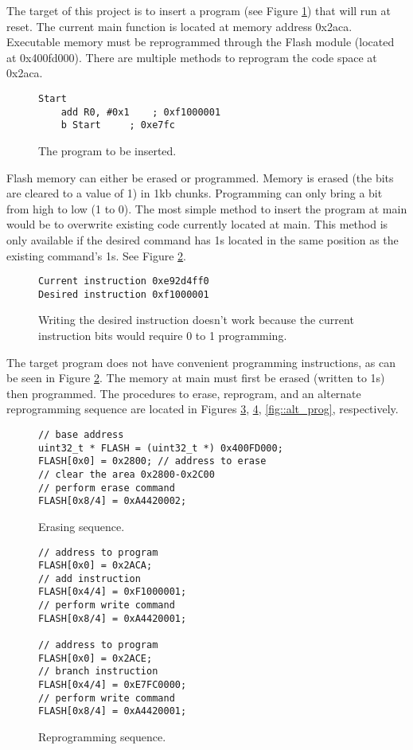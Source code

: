 The target of this project is to insert a program (see Figure \ref{fig::insert}) that will run at reset. The current main function is located at memory address 0x2aca. Executable memory must be reprogrammed through the Flash module (located at 0x400fd000). There are multiple methods to reprogram the code space at 0x2aca. 
	\begin{figure}[htbp]
		\begin{lstlisting}
Start
	add R0, #0x1 	; 0xf1000001
	b Start		; 0xe7fc
		\end{lstlisting}
		\caption{The program to be inserted. }\label{fig::insert}
	\end{figure}

Flash memory can either be erased or programmed. Memory is erased (the bits are cleared to a value of 1) in 1kb chunks. Programming can only bring a bit from high to low (1 to 0). The most simple method to insert the program at main would be to overwrite existing code currently located at main. This method is only available if the desired command has 1s located in the same position as the existing command's 1s. See Figure \ref{fig::ham}. 
	\begin{figure}[htbp]
		\begin{lstlisting}
Current instruction	0xe92d4ff0
Desired instruction	0xf1000001
		\end{lstlisting}
		\caption{Writing the desired instruction doesn't work because the current instruction bits would require 0 to 1 programming.  }\label{fig::ham}
	\end{figure}
The target program does not have convenient programming instructions, as can be seen in Figure \ref{fig::ham}. The memory at main must first be erased (written to 1s) then programmed. The procedures to erase, reprogram, and an alternate reprogramming sequence are located in Figures \ref{fig::erase}, \ref{fig::prog}, \ref{fig::alt_prog}, respectively. 
		\lstset{language=C} 
	\begin{figure}[htbp]
		\begin{lstlisting}
// base address
uint32_t * FLASH = (uint32_t *) 0x400FD000;
FLASH[0x0] = 0x2800; // address to erase
// clear the area 0x2800-0x2C00
// perform erase command
FLASH[0x8/4] = 0xA4420002; 
		\end{lstlisting}
		\caption{Erasing sequence. }\label{fig::erase}
	\end{figure}
	\begin{figure}[htbp]
		\begin{lstlisting}
// address to program
FLASH[0x0] = 0x2ACA; 
// add instruction
FLASH[0x4/4] = 0xF1000001; 
// perform write command
FLASH[0x8/4] = 0xA4420001; 

// address to program
FLASH[0x0] = 0x2ACE; 
// branch instruction
FLASH[0x4/4] = 0xE7FC0000; 
// perform write command
FLASH[0x8/4] = 0xA4420001; 
		\end{lstlisting}
		\caption{Reprogramming sequence. }\label{fig::prog}
	\end{figure}
